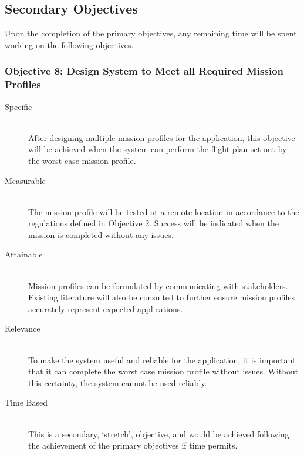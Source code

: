 \begin{appendices}
\subsection{Secondary Objectives}

Upon the completion of the primary objectives, any remaining time will be spent working on the following objectives.

\subsubsection{Objective 8: Design System to Meet all Required Mission Profiles}

\begin{description}
    \item[Specific] \hfill \\
    After designing multiple mission profiles for the application, this objective will be achieved when the system can perform the flight plan set out by the worst case mission profile.
    \item[Measurable] \hfill \\
    The mission profile will be tested at a remote location in accordance to the regulations defined in Objective 2. Success will be indicated when the mission is completed without any issues.
    \item[Attainable] \hfill \\
    Mission profiles can be formulated by communicating with stakeholders. Existing literature will also be consulted to further ensure mission profiles accurately represent expected applications.
    \item[Relevance] \hfill \\
    To make the system useful and reliable for the application, it is important that it can complete the worst case mission profile without issues. Without this certainty, the system cannot be used reliably.
    \item[Time Based] \hfill \\
     This is a secondary, `stretch', objective, and would be achieved following the achievement of the primary objectives if time permits.
\end{description}


\end{appendices}

